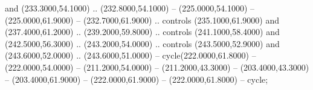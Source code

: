 and (233.3000,54.1000) .. (232.8000,54.1000) -- (225.0000,54.1000) -- (225.0000,61.9000) -- (232.7000,61.9000) .. controls (235.1000,61.9000) and (237.4000,61.2000) .. (239.2000,59.8000) .. controls (241.1000,58.4000) and (242.5000,56.3000) .. (243.2000,54.0000) .. controls (243.5000,52.9000) and (243.6000,52.0000) .. (243.6000,51.0000) -- cycle(222.0000,61.8000) -- (222.0000,54.0000) -- (211.2000,54.0000) -- (211.2000,43.3000) -- (203.4000,43.3000) -- (203.4000,61.9000) -- (222.0000,61.9000) -- (222.0000,61.8000) -- cycle;